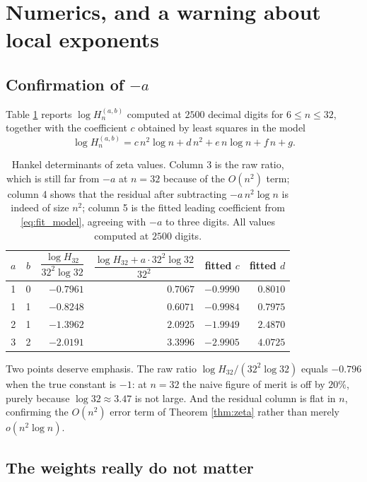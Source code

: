 \documentclass[11pt]{amsart}
\numberwithin{equation}{section}
\theoremstyle{plain}
\theoremstyle{definition}
\theoremstyle{remark}
\begin{document}
\section{Numerics, and a warning about local exponents}
\label{sec:numerics}

\subsection{Confirmation of $-a$}

Table \ref{tab:zeta} reports $\log H_{n}^{(a,b)}$ computed at $2500$ decimal digits for
$6\le n\le32$, together with the coefficient $c$ obtained by least squares in the model
\begin{equation}
\log H_{n}^{(a,b)}=c\,n^{2}\log n+d\,n^{2}+e\,n\log n+f\,n+g .
\label{eq:fit_model}
\end{equation}

\begin{table}[htbp]
\centering
\begin{tabular}{ccrrrr}
\toprule
$a$ & $b$ & $\dfrac{\log H_{32}}{32^{2}\log32}$ & $\dfrac{\log H_{32}+a\cdot32^{2}\log32}{32^{2}}$ & fitted $c$ & fitted $d$\\
\midrule
1 & 0 & $-0.7961$ & $0.7067$ & $-0.9990$ & $0.8010$\\
1 & 1 & $-0.8248$ & $0.6071$ & $-0.9984$ & $0.7975$\\
2 & 1 & $-1.3962$ & $2.0925$ & $-1.9949$ & $2.4870$\\
3 & 2 & $-2.0191$ & $3.3996$ & $-2.9905$ & $4.0725$\\
\bottomrule
\end{tabular}
\caption{Hankel determinants of zeta values. Column 3 is the raw ratio, which is
still far from $-a$ at $n=32$ because of the $O(n^{2})$ term; column 4 shows that the residual
after subtracting $-a\,n^{2}\log n$ is indeed of size $n^{2}$; column 5 is the fitted leading
coefficient from \eqref{eq:fit_model}, agreeing with $-a$ to three digits. All values computed at
$2500$ digits.}
\label{tab:zeta}
\end{table}

Two points deserve emphasis. The raw ratio $\log H_{32}/(32^{2}\log32)$ equals $-0.796$ when the
true constant is $-1$: at $n=32$ the naive figure of merit is off by $20\%$, purely because
$\log32\approx3.47$ is not large. And the residual column is flat in $n$, confirming the $O(n^{2})$
error term of Theorem \ref{thm:zeta} rather than merely $o(n^{2}\log n)$.

\subsection{The weights really do not matter}
\end{document}
